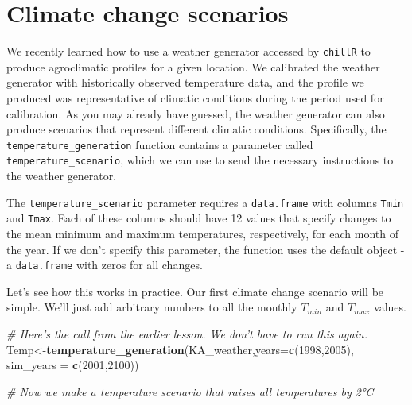 \documentclass[
]{book}
\newenvironment{Shaded}{\begin{snugshade}}{\end{snugshade}}
\newcommand{\CommentTok}[1]{\textcolor[rgb]{0.56,0.35,0.01}{\textit{#1}}}
\newcommand{\DataTypeTok}[1]{\textcolor[rgb]{0.13,0.29,0.53}{#1}}
\newcommand{\DecValTok}[1]{\textcolor[rgb]{0.00,0.00,0.81}{#1}}
\newcommand{\KeywordTok}[1]{\textcolor[rgb]{0.13,0.29,0.53}{\textbf{#1}}}
\newcommand{\NormalTok}[1]{#1}
\newcommand{\OperatorTok}[1]{\textcolor[rgb]{0.81,0.36,0.00}{\textbf{#1}}}
\newcommand{\StringTok}[1]{\textcolor[rgb]{0.31,0.60,0.02}{#1}}
\begin{document}
\hypertarget{climate-change-scenarios}{%
\section{Climate change scenarios}\label{climate-change-scenarios}}

We recently learned how to use a weather generator accessed by \texttt{chillR} to produce agroclimatic profiles for a given location. We calibrated the weather generator with historically observed temperature data, and the profile we produced was representative of climatic conditions during the period used for calibration. As you may already have guessed, the weather generator can also produce scenarios that represent different climatic conditions. Specifically, the \texttt{temperature\_generation} function contains a parameter called \texttt{temperature\_scenario}, which we can use to send the necessary instructions to the weather generator.

The \texttt{temperature\_scenario} parameter requires a \texttt{data.frame} with columns \texttt{Tmin} and \texttt{Tmax}. Each of these columns should have 12 values that specify changes to the mean minimum and maximum temperatures, respectively, for each month of the year. If we don't specify this parameter, the function uses the default object - a \texttt{data.frame} with zeros for all changes.

Let's see how this works in practice. Our first climate change scenario will be simple. We'll just add arbitrary numbers to all the monthly \(T_{min}\) and \(T_{max}\) values.

\begin{Shaded}
\begin{Highlighting}[]
\CommentTok{# Here's the call from the earlier lesson. We don't have to run this again.}
\NormalTok{Temp<-}\KeywordTok{temperature_generation}\NormalTok{(KA_weather,}\DataTypeTok{years=}\KeywordTok{c}\NormalTok{(}\DecValTok{1998}\NormalTok{,}\DecValTok{2005}\NormalTok{), }\DataTypeTok{sim_years =} \KeywordTok{c}\NormalTok{(}\DecValTok{2001}\NormalTok{,}\DecValTok{2100}\NormalTok{))}
 
\CommentTok{# Now we make a temperature scenario that raises all temperatures by 2°C}
\end{Highlighting}
\end{Shaded}

\begin{Shaded}
\end{Shaded}
\end{document}
